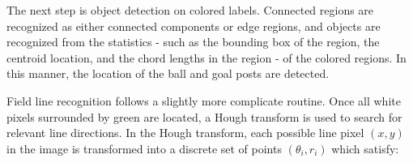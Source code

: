 \documentclass{article}
\begin{document}
	\begin{figure}[H]
		\centering
    		\quad
    		\quad
  	      \caption{}
	\end{figure}



	The next step is object detection on colored labels. Connected regions are recognized as either connected components or edge regions, and objects are recognized from the statistics - such as the bounding box of the region, the centroid location, and the chord lengths in the region - of the colored regions. In this manner, the location of the ball and goal posts are detected. 

	Field line recognition follows a slightly more complicate routine. Once all white pixels surrounded by green are located, a Hough transform is used to search for relevant line directions. In the Hough transform, each possible line pixel \((x, y)\) in the image is transformed into a discrete set of points \((\theta_{i},r_{i})\) which satisfy:
  
\end{document}
